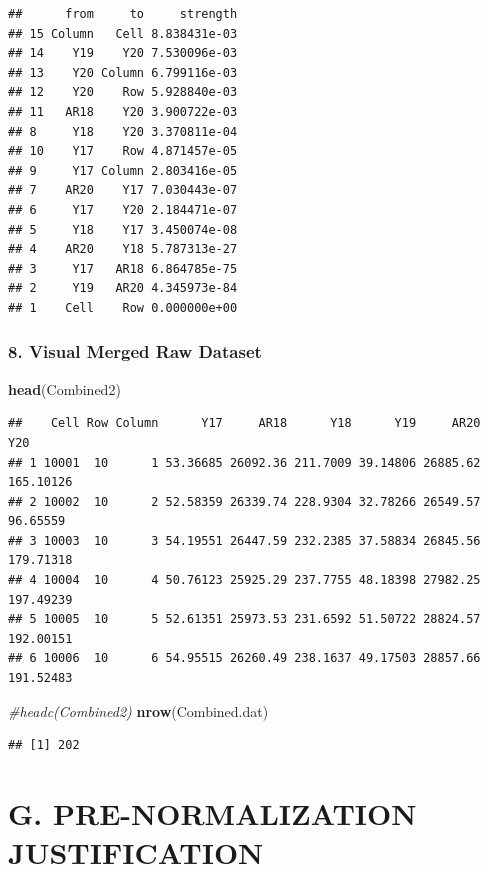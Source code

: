 \documentclass[
]{article}
\newenvironment{Shaded}{\begin{snugshade}}{\end{snugshade}}
\newcommand{\CommentTok}[1]{\textcolor[rgb]{0.56,0.35,0.01}{\textit{#1}}}
\newcommand{\FunctionTok}[1]{\textcolor[rgb]{0.13,0.29,0.53}{\textbf{#1}}}
\newcommand{\NormalTok}[1]{#1}
\begin{document}
\begin{verbatim}
##      from     to     strength
## 15 Column   Cell 8.838431e-03
## 14    Y19    Y20 7.530096e-03
## 13    Y20 Column 6.799116e-03
## 12    Y20    Row 5.928840e-03
## 11   AR18    Y20 3.900722e-03
## 8     Y18    Y20 3.370811e-04
## 10    Y17    Row 4.871457e-05
## 9     Y17 Column 2.803416e-05
## 7    AR20    Y17 7.030443e-07
## 6     Y17    Y20 2.184471e-07
## 5     Y18    Y17 3.450074e-08
## 4    AR20    Y18 5.787313e-27
## 3     Y17   AR18 6.864785e-75
## 2     Y19   AR20 4.345973e-84
## 1    Cell    Row 0.000000e+00
\end{verbatim}

\subsubsection{8. Visual Merged Raw
Dataset}\label{visual-merged-raw-dataset}

\begin{Shaded}
\begin{Highlighting}[]
\FunctionTok{head}\NormalTok{(Combined2)}
\end{Highlighting}
\end{Shaded}

\begin{verbatim}
##    Cell Row Column      Y17     AR18      Y18      Y19     AR20       Y20
## 1 10001  10      1 53.36685 26092.36 211.7009 39.14806 26885.62 165.10126
## 2 10002  10      2 52.58359 26339.74 228.9304 32.78266 26549.57  96.65559
## 3 10003  10      3 54.19551 26447.59 232.2385 37.58834 26845.56 179.71318
## 4 10004  10      4 50.76123 25925.29 237.7755 48.18398 27982.25 197.49239
## 5 10005  10      5 52.61351 25973.53 231.6592 51.50722 28824.57 192.00151
## 6 10006  10      6 54.95515 26260.49 238.1637 49.17503 28857.66 191.52483
\end{verbatim}

\begin{Shaded}
\begin{Highlighting}[]
\CommentTok{\#headc(Combined2)}
\FunctionTok{nrow}\NormalTok{(Combined.dat)}
\end{Highlighting}
\end{Shaded}

\begin{verbatim}
## [1] 202
\end{verbatim}

\section{G. PRE-NORMALIZATION
JUSTIFICATION}\label{g.-pre-normalization-justification}
\end{document}
